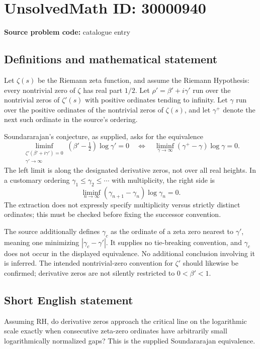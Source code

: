 \documentclass[11pt]{article}
\begin{document}
\section*{UnsolvedMath ID: 30000940}
\textbf{Source problem code:} catalogue entry
\subsection{Definitions and mathematical statement}
Let \(\zeta(s)\) be the Riemann zeta function, and assume the Riemann Hypothesis: every nontrivial zero of \(\zeta\) has real part \(1/2\). Let \(\rho'=\beta'+i\gamma'\) run over the nontrivial zeros of \(\zeta'(s)\) with positive ordinates tending to infinity. Let \(\gamma\) run over the positive ordinates of the nontrivial zeros of \(\zeta(s)\), and let \(\gamma^+\) denote the next such ordinate in the source's ordering.

Soundararajan's conjecture, as supplied, asks for the equivalence
\[
\liminf_{\substack{\zeta'(\beta'+i\gamma')=0\\\gamma'\to\infty}}
(\beta'-\tfrac12)\log\gamma'=0
\quad\Longleftrightarrow\quad
\liminf_{\gamma\to\infty}(\gamma^+-\gamma)\log\gamma=0.
\]
The left limit is along the designated derivative zeros, not over all real heights. In a customary ordering \(\gamma_1\leq\gamma_2\leq\cdots\) with multiplicity, the right side is
\[
\liminf_{n\to\infty}(\gamma_{n+1}-\gamma_n)\log\gamma_n=0.
\]
The extraction does not expressly specify multiplicity versus strictly distinct ordinates; this must be checked before fixing the successor convention.

The source additionally defines \(\gamma_c\) as the ordinate of a zeta zero nearest to \(\gamma'\), meaning one minimizing \(|\gamma_c-\gamma'|\). It supplies no tie-breaking convention, and \(\gamma_c\) does not occur in the displayed equivalence. No additional conclusion involving it is inferred. The intended nontrivial-zero convention for \(\zeta'\) should likewise be confirmed; derivative zeros are not silently restricted to \(0<\beta'<1\).
\subsection{Short English statement}
Assuming RH, do derivative zeros approach the critical line on the logarithmic scale exactly when consecutive zeta-zero ordinates have arbitrarily small logarithmically normalized gaps? This is the supplied Soundararajan equivalence.
\end{document}
